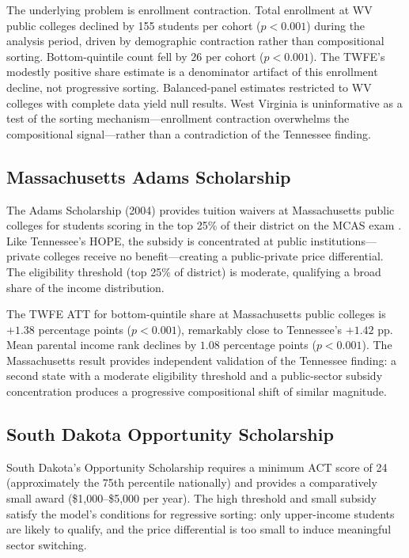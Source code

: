 The underlying problem is enrollment contraction. Total enrollment at
WV public colleges declined by 155 students per cohort ($p < 0.001$)
during the analysis period, driven by demographic contraction rather
than compositional sorting. Bottom-quintile count fell by 26 per
cohort ($p < 0.001$). The TWFE's modestly positive share estimate
is a denominator artifact of this enrollment decline, not progressive
sorting. Balanced-panel estimates restricted to WV colleges with
complete data yield null results. West Virginia is uninformative as a
test of the sorting mechanism---enrollment contraction overwhelms the
compositional signal---rather than a contradiction of the Tennessee
finding.

\subsection{Massachusetts Adams Scholarship}

The Adams Scholarship (2004) provides tuition waivers at Massachusetts
public colleges for students scoring in the top 25\% of their district
on the MCAS exam \parencite{cohodes2014merit}. Like Tennessee's HOPE,
the subsidy is concentrated at public institutions---private colleges
receive no benefit---creating a public-private price differential. The
eligibility threshold (top 25\% of district) is moderate, qualifying a
broad share of the income distribution.

The TWFE ATT for bottom-quintile share at Massachusetts public colleges
is $+1.38$ percentage points ($p < 0.001$), remarkably close to
Tennessee's $+1.42$ pp. Mean parental income rank declines by $1.08$
percentage points ($p < 0.001$). The Massachusetts result
provides independent validation of the Tennessee finding: a second
state with a moderate eligibility threshold and a public-sector subsidy
concentration produces a progressive compositional shift of similar
magnitude.

\subsection{South Dakota Opportunity Scholarship}

South Dakota's Opportunity Scholarship requires a minimum ACT score of
24 (approximately the 75th percentile nationally) and provides a
comparatively small award (\$1,000--\$5,000 per year). The high
threshold and small subsidy satisfy the model's conditions for
regressive sorting: only upper-income students are likely to qualify,
and the price differential is too small to induce meaningful sector
switching.

